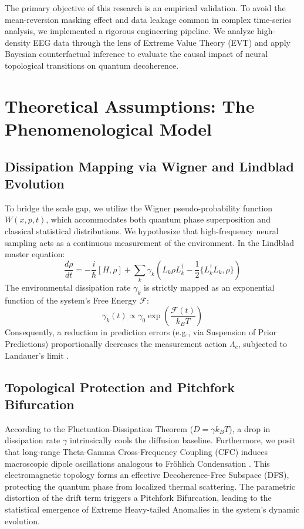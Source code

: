 \documentclass[10pt,twocolumn,letterpaper]{article}
\begin{document}
The primary objective of this research is an empirical validation. To avoid the mean-reversion masking effect and data leakage common in complex time-series analysis, we implemented a rigorous engineering pipeline. We analyze high-density EEG data through the lens of Extreme Value Theory (EVT) and apply Bayesian counterfactual inference \cite{Pearl2009} to evaluate the causal impact of neural topological transitions on quantum decoherence.

\section{Theoretical Assumptions: The Phenomenological Model}

\subsection{Dissipation Mapping via Wigner and Lindblad Evolution}
To bridge the scale gap, we utilize the Wigner pseudo-probability function $W(x, p, t)$, which accommodates both quantum phase superposition and classical statistical distributions. We hypothesize that high-frequency neural sampling acts as a continuous measurement of the environment. In the Lindblad master equation:
\begin{equation}
\frac{d\rho}{dt} = -\frac{i}{\hbar}[H, \rho] + \sum_k \gamma_k \left( L_k \rho L_k^\dagger - \frac{1}{2}\{L_k^\dagger L_k, \rho\} \right)
\end{equation}
The environmental dissipation rate $\gamma_k$ is strictly mapped as an exponential function of the system's Free Energy $\mathcal{F}$:
\begin{equation}
\gamma_k(t) \propto \gamma_0 \exp\left(\frac{\mathcal{F}(t)}{k_B T}\right)
\end{equation}
Consequently, a reduction in prediction errors (e.g., via Suspension of Prior Predictions) proportionally decreases the measurement action $\Lambda_c$, subjected to Landauer's limit \cite{Landauer1961}.

\subsection{Topological Protection and Pitchfork Bifurcation}
According to the Fluctuation-Dissipation Theorem ($D = \gamma k_B T$), a drop in dissipation rate $\gamma$ intrinsically cools the diffusion baseline. Furthermore, we posit that long-range Theta-Gamma Cross-Frequency Coupling (CFC) induces macroscopic dipole oscillations analogous to Fr\"ohlich Condensation \cite{Frohlich1968}. This electromagnetic topology forms an effective Decoherence-Free Subspace (DFS), protecting the quantum phase from localized thermal scattering. The parametric distortion of the drift term triggers a Pitchfork Bifurcation, leading to the statistical emergence of Extreme Heavy-tailed Anomalies in the system's dynamic evolution.
\end{document}
